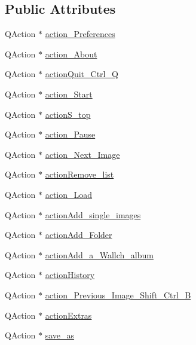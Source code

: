 \subsection*{Public Attributes}
\begin{DoxyCompactItemize}
\item 
QAction $\ast$ \hyperlink{classUi__MainWindow_a0c698e3df44548c69ba5d38d50402d32}{action\_\-Preferences}
\item 
QAction $\ast$ \hyperlink{classUi__MainWindow_ac2669cdd6ec6085dbd477c3636ddab29}{action\_\-About}
\item 
QAction $\ast$ \hyperlink{classUi__MainWindow_a5b3976b2349b3d27d15ef51b0b09513a}{actionQuit\_\-Ctrl\_\-Q}
\item 
QAction $\ast$ \hyperlink{classUi__MainWindow_ae338c30b4948a2301c9b166b4f384671}{action\_\-Start}
\item 
QAction $\ast$ \hyperlink{classUi__MainWindow_a77fdca5e1deec736a80260027d4914ae}{actionS\_\-top}
\item 
QAction $\ast$ \hyperlink{classUi__MainWindow_a0c7d1b72703df51a22fba67c15a31e8b}{action\_\-Pause}
\item 
QAction $\ast$ \hyperlink{classUi__MainWindow_ae13b44517a6ac27b75f9068fedaf43b3}{action\_\-Next\_\-Image}
\item 
QAction $\ast$ \hyperlink{classUi__MainWindow_af6c2d7008e1c022ea212377f7e1d2996}{actionRemove\_\-list}
\item 
QAction $\ast$ \hyperlink{classUi__MainWindow_a738e92d19d3efa6a6c8c7054f23fbd26}{action\_\-Load}
\item 
QAction $\ast$ \hyperlink{classUi__MainWindow_a48c15a8b0d5bd0ba1289d785e76a744b}{actionAdd\_\-single\_\-images}
\item 
QAction $\ast$ \hyperlink{classUi__MainWindow_a3cae951a389067a889312a8db264268e}{actionAdd\_\-Folder}
\item 
QAction $\ast$ \hyperlink{classUi__MainWindow_adbdbc9d312e983ed7ffa1a99793eeec7}{actionAdd\_\-a\_\-Wallch\_\-album}
\item 
QAction $\ast$ \hyperlink{classUi__MainWindow_a888a3a2a55d1179693017dc98e281b76}{actionHistory}
\item 
QAction $\ast$ \hyperlink{classUi__MainWindow_a109a2b59e51d886849f706bf6ff4a13d}{action\_\-Previous\_\-Image\_\-Shift\_\-Ctrl\_\-B}
\item 
QAction $\ast$ \hyperlink{classUi__MainWindow_ace7456abb046b1c717cb786b1643e60e}{actionExtras}
\item 
QAction $\ast$ \hyperlink{classUi__MainWindow_aecff87ababbfe64a3e91c5129cba2274}{save\_\-as}

\end{DoxyCompactItemize}
